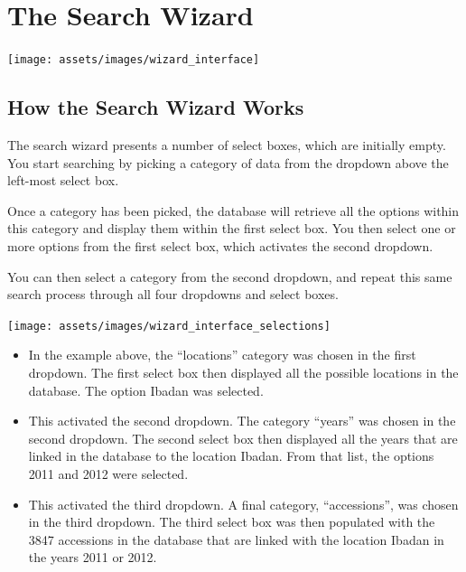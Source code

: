 \documentclass[
  12pt,
]{book}
\begin{document}
\hypertarget{search-wizard}{%
\section{The Search Wizard}\label{search-wizard}}

\begin{center}\texttt{[image: assets/images/wizard\_interface]} \end{center}

\hypertarget{how-the-search-wizard-works}{%
\subsection{How the Search Wizard Works}\label{how-the-search-wizard-works}}

The search wizard presents a number of select boxes, which are initially empty. You start searching by picking a category of data from the dropdown above the left-most select box.

Once a category has been picked, the database will retrieve all the options within this category and display them within the first select box. You then select one or more options from the first select box, which activates the second dropdown.

You can then select a category from the second dropdown, and repeat this same search process through all four dropdowns and select boxes.

\begin{center}\texttt{[image: assets/images/wizard\_interface\_selections]} \end{center}

\begin{itemize}
\item
  In the example above, the ``locations'' category was chosen in the first dropdown. The first select box then displayed all the possible locations in the database. The option Ibadan was selected.
\item
  This activated the second dropdown. The category ``years'' was chosen in the second dropdown. The second select box then displayed all the years that are linked in the database to the location Ibadan. From that list, the options 2011 and 2012 were selected.
\item
  This activated the third dropdown. A final category, ``accessions'', was chosen in the third dropdown. The third select box was then populated with the 3847 accessions in the database that are linked with the location Ibadan in the years 2011 or 2012.
\end{itemize}
\end{document}
